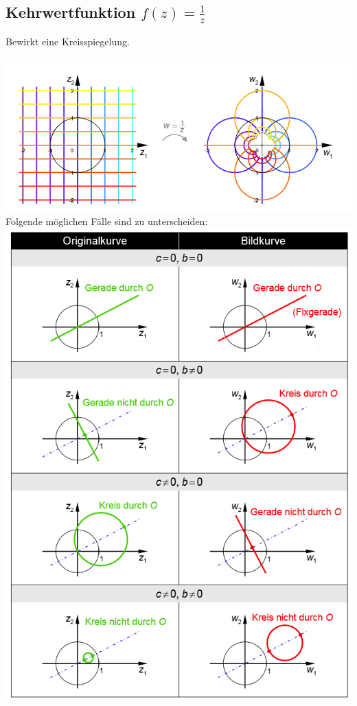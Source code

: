 \newpage

\subsection{Kehrwertfunktion $f(z) = \frac{1}{z}$}
Bewirkt eine Kreisspiegelung.

\includegraphics[width=\columnwidth]{Images/kehrwert_funktion}
\noindent Folgende möglichen Fälle sind zu unterscheiden:\\
\includegraphics[width=\columnwidth]{Images/kreisspiegelung}


